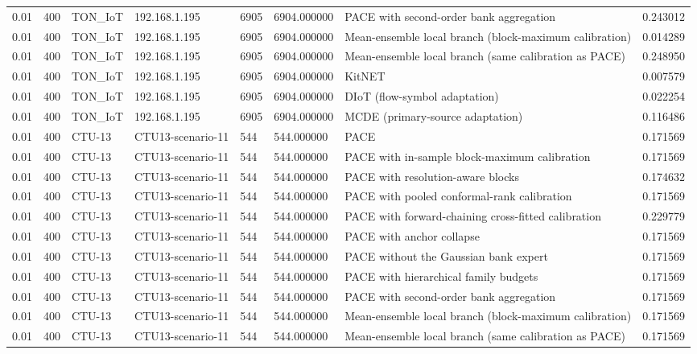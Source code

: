 \begin{tabular}{llllllll}
0.01 & 400 & TON\_IoT & 192.168.1.195 & 6905 & 6904.000000 & PACE with second-order bank aggregation & 0.243012 \\
0.01 & 400 & TON\_IoT & 192.168.1.195 & 6905 & 6904.000000 & Mean-ensemble local branch (block-maximum calibration) & 0.014289 \\
0.01 & 400 & TON\_IoT & 192.168.1.195 & 6905 & 6904.000000 & Mean-ensemble local branch (same calibration as PACE) & 0.248950 \\
0.01 & 400 & TON\_IoT & 192.168.1.195 & 6905 & 6904.000000 & KitNET & 0.007579 \\
0.01 & 400 & TON\_IoT & 192.168.1.195 & 6905 & 6904.000000 & DIoT (flow-symbol adaptation) & 0.022254 \\
0.01 & 400 & TON\_IoT & 192.168.1.195 & 6905 & 6904.000000 & MCDE (primary-source adaptation) & 0.116486 \\
0.01 & 400 & CTU-13 & CTU13-scenario-11 & 544 & 544.000000 & PACE & 0.171569 \\
0.01 & 400 & CTU-13 & CTU13-scenario-11 & 544 & 544.000000 & PACE with in-sample block-maximum calibration & 0.171569 \\
0.01 & 400 & CTU-13 & CTU13-scenario-11 & 544 & 544.000000 & PACE with resolution-aware blocks & 0.174632 \\
0.01 & 400 & CTU-13 & CTU13-scenario-11 & 544 & 544.000000 & PACE with pooled conformal-rank calibration & 0.171569 \\
0.01 & 400 & CTU-13 & CTU13-scenario-11 & 544 & 544.000000 & PACE with forward-chaining cross-fitted calibration & 0.229779 \\
0.01 & 400 & CTU-13 & CTU13-scenario-11 & 544 & 544.000000 & PACE with anchor collapse & 0.171569 \\
0.01 & 400 & CTU-13 & CTU13-scenario-11 & 544 & 544.000000 & PACE without the Gaussian bank expert & 0.171569 \\
0.01 & 400 & CTU-13 & CTU13-scenario-11 & 544 & 544.000000 & PACE with hierarchical family budgets & 0.171569 \\
0.01 & 400 & CTU-13 & CTU13-scenario-11 & 544 & 544.000000 & PACE with second-order bank aggregation & 0.171569 \\
0.01 & 400 & CTU-13 & CTU13-scenario-11 & 544 & 544.000000 & Mean-ensemble local branch (block-maximum calibration) & 0.171569 \\
0.01 & 400 & CTU-13 & CTU13-scenario-11 & 544 & 544.000000 & Mean-ensemble local branch (same calibration as PACE) & 0.171569 \\

\end{tabular}
